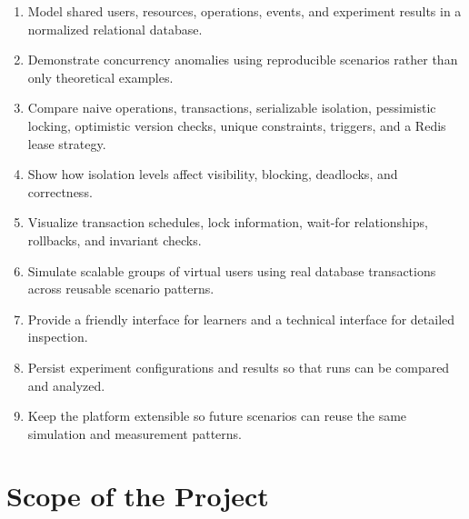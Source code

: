 \documentclass[12pt,a4paper]{article}
\begin{document}
\begin{enumerate}
\item Model shared users, resources, operations, events, and experiment results in a normalized relational database.
\item Demonstrate concurrency anomalies using reproducible scenarios rather than only theoretical examples.
\item Compare naive operations, transactions, serializable isolation, pessimistic locking, optimistic version checks, unique constraints, triggers, and a Redis lease strategy.
\item Show how isolation levels affect visibility, blocking, deadlocks, and correctness.
\item Visualize transaction schedules, lock information, wait-for relationships, rollbacks, and invariant checks.
\item Simulate scalable groups of virtual users using real database transactions across reusable scenario patterns.
\item Provide a friendly interface for learners and a technical interface for detailed inspection.
\item Persist experiment configurations and results so that runs can be compared and analyzed.
\item Keep the platform extensible so future scenarios can reuse the same simulation and measurement patterns.
\end{enumerate}

\section{Scope of the Project}
\end{document}
